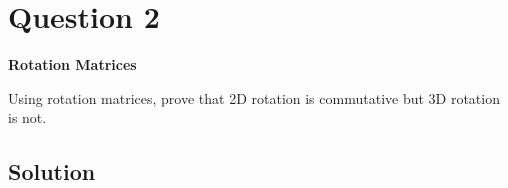 \section*{Question 2}

\textbf{Rotation Matrices}

Using rotation matrices, prove that 2D rotation is commutative but 3D rotation is not.

\subsection*{Solution}
